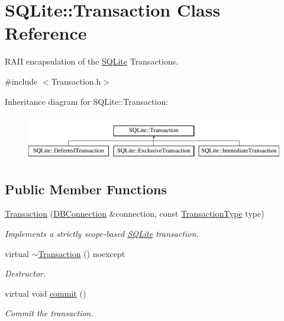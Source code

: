 \hypertarget{a00014}{\section{S\-Q\-Lite\-:\-:Transaction Class Reference}
\label{a00014}
}


R\-A\-I\-I encapsulation of the \hyperlink{a00038}{S\-Q\-Lite} Transactions.  




{\ttfamily \#include $<$Transaction.\-h$>$}

Inheritance diagram for S\-Q\-Lite\-:\-:Transaction\-:\begin{figure}[H]
\begin{center}
\leavevmode
\includegraphics[height=2.000000cm]{a00014}
\end{center}
\end{figure}
\subsection*{Public Member Functions}
\begin{DoxyCompactItemize}
\item 
\hyperlink{a00014_a27add1a1db2dd8cd5935c78a63ad556b}{Transaction} (\hyperlink{a00004}{D\-B\-Connection} \&connection, const \hyperlink{a00038_af94f2dd6dcae8699eada7a0382e48e66}{Transaction\-Type} type)
\begin{DoxyCompactList}\small\item\em Implements a strictly scope-\/based \hyperlink{a00038}{S\-Q\-Lite} transaction. \end{DoxyCompactList}\item 
virtual \hyperlink{a00014_a43c5e67a10b9698b7f6dad73539feb94}{$\sim$\-Transaction} () noexcept
\begin{DoxyCompactList}\small\item\em Destructor. \end{DoxyCompactList}\item 
\hypertarget{a00014_a9b251d84198cdc2c0208ad566fec0287}{virtual void \hyperlink{a00014_a9b251d84198cdc2c0208ad566fec0287}{commit} ()}\label{a00014_a9b251d84198cdc2c0208ad566fec0287}

\begin{DoxyCompactList}\small\item\em Commit the transaction. \end{DoxyCompactList}\end{DoxyCompactItemize}


